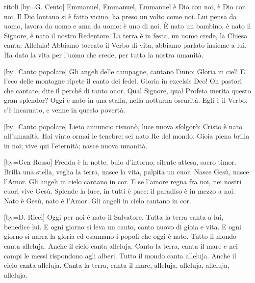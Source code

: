 \begin{songs}{titoli}
[by={G. Cento}]
\beginchorus
Emmanuel, Emmanuel,
Emmanuel è Dio con noi, è Dio con noi. 
\endchorus
\beginverse
Il Dio lontano si è fatto vicino, ha preso un volto come noi.
Lui pensa da uomo, lavora da uomo e ama da uomo: è uno di noi.
\endverse
\beginverse
È nato un bambino, è nato il Signore, è nato il nostro Redentore.
La terra è in festa, un uomo crede, la Chiesa canta: Alleluia!
\endverse
\beginverse
Abbiamo toccato il Verbo di vita, abbiamo parlato insieme a lui.
Ha dato la vita per l'uomo che crede, per tutta la nostra umanità.
\endverse
\endsong

[by={Canto popolare}]
\beginverse
Gli angeli delle campagne, cantano l'inno: Gloria in ciel!
E l'eco delle montagne ripete il canto dei fedel.
\endverse
\beginchorus
Gloria in excelsis Deo! 
\endchorus
\beginverse
Oh pastori che cantate, dite il perché di tanto onor.
Qual Signore, qual Profeta merita questo gran splendor?
\endverse
\beginverse
Oggi è nato in una stalla, nella notturna oscurità.
Egli è il Verbo, s'è incarnato, e venne in questa povertà.
\endverse
\endsong

[by={Canto popolare}]
\beginverse
Lieto annuncio risuonò, luce nuova sfolgorò: Cristo è nato all'umanità.
\endverse
\beginchorus
Hai vinto ormai le tenebre: sei nato Re del mondo. 
\endchorus
\beginverse
Gioia piena brilla in noi; vive qui l'eternità; nasce nuova umanità.
\endverse
\endsong

[by={Gen Rosso}]
\beginverse
Fredda è la notte, buio d'intorno, silente attesa, sacro timor.
Brilla una stella, veglia la terra, nasce la vita, palpita un cuor.
\endverse
\beginchorus
Nasce Gesù, nasce l'Amor. Gli angeli in cielo cantano in cor. 
\endchorus
\beginverse
E se l'amore regna fra noi, nei nostri cuori vive Gesù.
Splende la luce, in tutti è pace: il paradiso è in mezzo a noi.
\endverse
\beginverse*
Nato è Gesù, nato è l'Amor. Gli angeli in cielo cantano in cor. 
\endverse
\endsong

[by={D. Ricci}]
\beginverse
Oggi per noi è nato il Salvatore. Tutta la terra canta a lui, benedice lui.
E ogni giorno si leva un canto, canto nuovo di gioia e vita.
E ogni giorno si narra la gloria ed osannano i popoli che oggi è nato.
\endverse
\beginchorus
Tutto il mondo canta alleluja. Anche il cielo canta alleluja.
Canta la terra, canta il mare
e nei campi le messi rispondono agli alberi. 
\endchorus
\beginverse*
Tutto il mondo canta alleluja. Anche il cielo canta alleluja.
Canta la terra, canta il mare,
alleluja, alleluja, alleluja, alleluja.
\endverse
\endsong


\end{songs}

